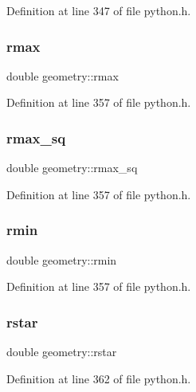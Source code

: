 Definition at line 347 of file python.\+h.

\mbox{\label{structgeometry_a7e0e317f07c82f819badcb1cfc4fc478}} 
\subsubsection{\texorpdfstring{rmax}{rmax}}
{\footnotesize\ttfamily double geometry\+::rmax}



Definition at line 357 of file python.\+h.

\mbox{\label{structgeometry_a3cc932b452e5ef95290b078dc39f0c50}} 
\subsubsection{\texorpdfstring{rmax\+\_\+sq}{rmax\_sq}}
{\footnotesize\ttfamily double geometry\+::rmax\+\_\+sq}



Definition at line 357 of file python.\+h.

\mbox{\label{structgeometry_a85ec3f4bef73b748bc3f0e3f828a821f}} 
\subsubsection{\texorpdfstring{rmin}{rmin}}
{\footnotesize\ttfamily double geometry\+::rmin}



Definition at line 357 of file python.\+h.

\mbox{\label{structgeometry_a7384383e4129a0341c5a1a27a68d7947}} 
\subsubsection{\texorpdfstring{rstar}{rstar}}
{\footnotesize\ttfamily double geometry\+::rstar}



Definition at line 362 of file python.\+h.

